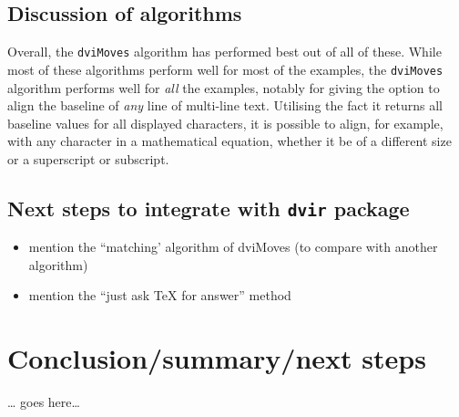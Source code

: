 \documentclass[]{article}
\begin{document}
\subsection{Discussion of algorithms}\label{discussion-of-algorithms}

Overall, the \texttt{dviMoves} algorithm has performed best out of all
of these. While most of these algorithms perform well for most of the
examples, the \texttt{dviMoves} algorithm performs well for \emph{all}
the examples, notably for giving the option to align the baseline of
\emph{any} line of multi-line text. Utilising the fact it returns all
baseline values for all displayed characters, it is possible to align,
for example, with any character in a mathematical equation, whether it
be of a different size or a superscript or subscript.

\subsection{\texorpdfstring{Next steps to integrate with \texttt{dvir}
package}{Next steps to integrate with dvir package}}\label{next-steps-to-integrate-with-dvir-package}

\begin{itemize}
\item
  mention the ``matching' algorithm of dviMoves (to compare with another
  algorithm)
\item
  mention the ``just ask TeX for answer'' method
\end{itemize}

\newpage{}

\section{Conclusion/summary/next
steps}\label{conclusionsummarynext-steps}

\ldots{} goes here\ldots{}
\end{document}
